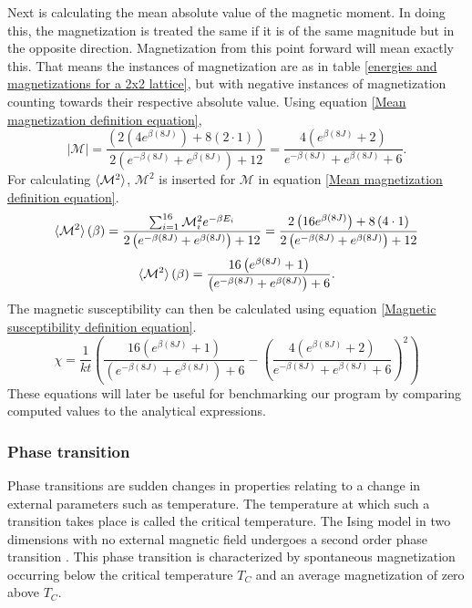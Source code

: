 \documentclass[10pt,a4paper]{article}
\begin{document}
Next is calculating the mean absolute value of the magnetic moment. In doing this, the magnetization is treated the same if it is of the same magnitude but in the opposite direction. Magnetization from this point forward will mean exactly this. That means the instances of magnetization are as in table \ref{energies and magnetizations for a 2x2 lattice}, but with negative instances of magnetization counting towards their respective absolute value. Using equation \eqref{Mean magnetization definition equation},
\begin{equation*}
|\mathcal{M}| = \frac{\left( 2\left( 4e^{\beta (8J)} \right) +8\left( 2\cdot1 \right)\right)}{2\left( e^{-\beta (8J)} +e^{\beta (8J)} \right)+12} = \frac{4\left(  e^{\beta (8J)}  +2\right)}{ e^{-\beta (8J)} +e^{\beta (8J)}+6}.
\end{equation*}
For calculating $\braket{\mathcal{M}^2}$, $\mathcal{M}^2$ is inserted for $\mathcal{M}$ in equation \eqref{Mean magnetization definition equation}.
\begin{equation*}
\braket{\mathcal{M}^2}(\beta) = \frac{\sum_{i=1}^{16} \mathcal{M}_i^2e^{-\beta E_i}}{2\left( e^{-\beta (8J)} +e^{\beta (8J)} \right)+12}  = \frac{2\left( 16e^{\beta (8J)} \right) +8\left( 4\cdot1 \right)}{2\left( e^{-\beta (8J)} +e^{\beta (8J)} \right)+12}  
\end{equation*}
\begin{equation}
\braket{\mathcal{M}^2}(\beta) = \frac{ 16\left( e^{\beta (8J)}  +1 \right)}{\left( e^{-\beta (8J)} +e^{\beta (8J)} \right)+6}.
\end{equation}
The magnetic susceptibility can then be calculated using equation \eqref{Magnetic susceptibility definition equation}.
\begin{equation}
\chi = \frac{1}{kt}\left( \frac{ 16\left( e^{\beta (8J)}  +1 \right)}{\left( e^{-\beta (8J)} +e^{\beta (8J)} \right)+6} - \left( \frac{4\left(  e^{\beta (8J)}  +2\right)}{ e^{-\beta (8J)} +e^{\beta (8J)}+6} \right)^2 \right)
\end{equation}
These equations will later be useful for benchmarking our program by comparing computed values to the analytical expressions.
\subsubsection{Phase transition}
Phase transitions are sudden changes in properties relating to a change in external parameters such as temperature. The temperature at which such a transition takes place is called the critical temperature. The Ising model in two dimensions with no external magnetic field undergoes a second order phase transition \cite{Lecture_Notes_Fall_2015}. This phase transition is characterized by spontaneous magnetization occurring below the critical temperature $T_C$ and an average magnetization of zero above $T_C$\cite{Lecture_Notes_Fall_2015}.
\end{document}
